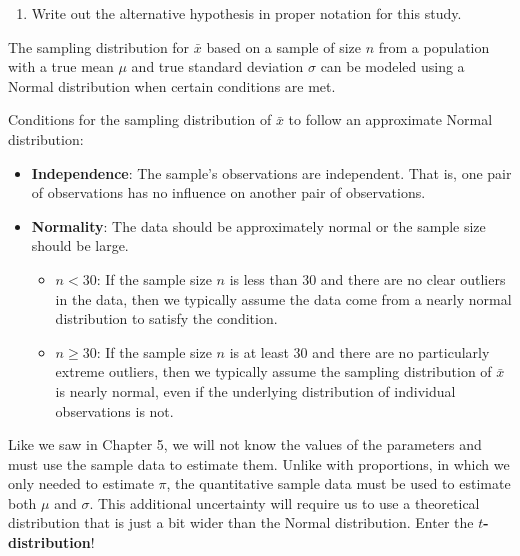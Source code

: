 \documentclass[
]{report}
\providecommand{\tightlist}{%
  \setlength{\itemsep}{0pt}\setlength{\parskip}{0pt}}
\begin{document}
\vspace{0.8in}

\begin{enumerate}
\def\labelenumi{\arabic{enumi}.}
\setcounter{enumi}{3}
\tightlist
\item
  Write out the alternative hypothesis in proper notation for this study.
\end{enumerate}

\vspace{0.5in}

The sampling distribution for \(\bar{x}\) based on a sample of size \(n\) from a population with a true mean \(\mu\) and true standard deviation \(\sigma\) can be modeled using a Normal distribution when certain conditions are met.

Conditions for the sampling distribution of \(\bar{x}\) to follow an approximate Normal distribution:

\begin{itemize}
\item
  \textbf{Independence}: The sample's observations are independent. That is, one pair of observations has no influence on another pair of observations.
\item
  \textbf{Normality}: The data should be approximately normal or the sample size should be large.

  \begin{itemize}
  \item
    \(n < 30\): If the sample size \(n\) is less than 30 and there are no clear outliers in the data, then we typically assume the data come from a nearly normal distribution to satisfy the condition.
  \item
    \(n \geq 30\): If the sample size \(n\) is at least 30 and there are no particularly extreme outliers, then we typically assume the sampling distribution of \(\bar{x}\) is nearly normal, even if the underlying distribution of individual observations is not.
  \end{itemize}
\end{itemize}

Like we saw in Chapter 5, we will not know the values of the parameters and must use the sample data to estimate them. Unlike with proportions, in which we only needed to estimate \(\pi\), the quantitative sample data must be used to estimate both \(\mu\) and \(\sigma\). This additional uncertainty will require us to use a theoretical distribution that is just a bit wider than the Normal distribution. Enter the \textbf{\(t\)-distribution}!
\end{document}
